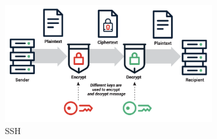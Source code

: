 \begin{figure}
    \centering
    \includegraphics[width=0.8\textwidth]{assets/ssh.png}
    \caption{SSH}
    \label{fig:ssh}
\end{figure}
